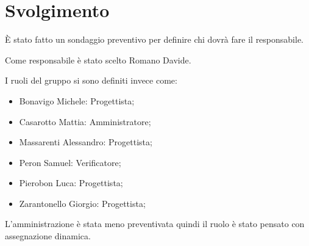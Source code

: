 \section{Svolgimento}

È stato fatto un sondaggio preventivo per definire chi dovrà fare il responsabile.

Come responsabile è stato scelto Romano Davide.

I ruoli del gruppo si sono definiti invece come:
\begin{itemize}
    \item Bonavigo Michele: Progettista;
    \item Casarotto Mattia: Amministratore;
    \item Massarenti Alessandro: Progettista;
    \item Peron Samuel: Verificatore;
    \item Pierobon Luca: Progettista;
    \item Zarantonello Giorgio: Progettista;
\end{itemize}

L'amministrazione è stata meno preventivata quindi il ruolo è stato pensato con assegnazione dinamica.
